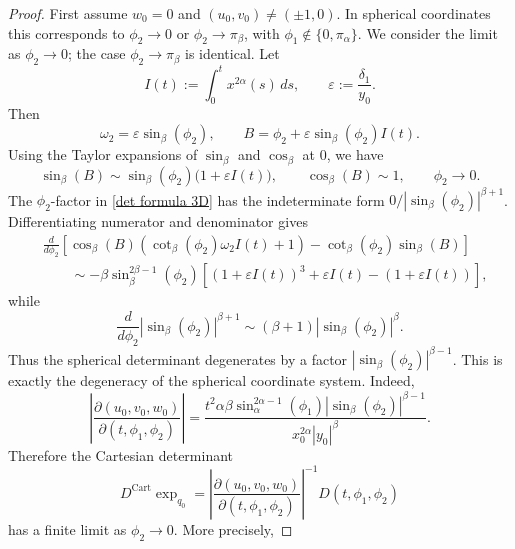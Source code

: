 \documentclass[12pt]{amsart}
\numberwithin{equation}{section}
\theoremstyle{plain}
\theoremstyle{definition}
\theoremstyle{remark}
\begin{document}
\begin{proof}
    First assume \(w_0=0\) and \((u_0,v_0)\neq(\pm1,0)\). In spherical coordinates this
    corresponds to \(\phi_2\to0\) or \(\phi_2\to\pi_\beta\), with
    \(\phi_1\notin\{0,\pi_\alpha\}\). We consider the limit as \(\phi_2\to0\); the case
    \(\phi_2\to\pi_\beta\) is identical. Let
    \[
        I(t):=\int_0^t x^{2\alpha}(s)\,ds,
        \qquad
        \varepsilon:=\frac{\delta_1}{y_0}.
    \]
    Then
    \[
        \omega_2=\varepsilon\sin_\beta(\phi_2),
        \qquad
        B=\phi_2+\varepsilon\sin_\beta(\phi_2)I(t).
    \]
    Using the Taylor expansions of \(\sin_\beta\) and \(\cos_\beta\) at \(0\), we have
    \[
        \sin_\beta(B)
        \sim
        \sin_\beta(\phi_2)\bigl(1+\varepsilon I(t)\bigr),
        \qquad
        \cos_\beta(B)\sim 1,
        \qquad
        \phi_2\to0.
    \]
    The \(\phi_2\)-factor in \eqref{det formula 3D} has the indeterminate form
    \(0/|\sin_\beta(\phi_2)|^{\beta+1}\). Differentiating numerator and denominator gives
    \[
        \begin{aligned}
             & \frac{d}{d\phi_2}
            \left[
                \cos_\beta(B)
                \left(\cot_\beta(\phi_2)\omega_2 I(t)+1\right)
                -
                \cot_\beta(\phi_2)\sin_\beta(B)
                \right]
            \\
             & \qquad\sim
            -\beta\sin_\beta^{2\beta-1}(\phi_2)
            \left[
                (1+\varepsilon I(t))^3
                +
                \varepsilon I(t)
                -
                (1+\varepsilon I(t))
                \right],
        \end{aligned}
    \]
    while
    \[
        \frac{d}{d\phi_2}
        |\sin_\beta(\phi_2)|^{\beta+1}
        \sim
        (\beta+1)|\sin_\beta(\phi_2)|^\beta .
    \]
    Thus the spherical determinant degenerates by a factor
    \(|\sin_\beta(\phi_2)|^{\beta-1}\). This is exactly the degeneracy of the spherical
    coordinate system. Indeed,
    \[
        \left|
        \frac{\partial(u_0,v_0,w_0)}
        {\partial(t,\phi_1,\phi_2)}
        \right|
        =
        \frac{
            t^2\alpha\beta
            \sin_\alpha^{2\alpha-1}(\phi_1)
            |\sin_\beta(\phi_2)|^{\beta-1}
        }{
            x_0^{2\alpha}|y_0|^\beta
        }.
    \]
    Therefore the Cartesian determinant
    \[
        D^{\operatorname{Cart}}\exp_{q_0}
        =
        \left|
        \frac{\partial(u_0,v_0,w_0)}
        {\partial(t,\phi_1,\phi_2)}
        \right|^{-1}
        D(t,\phi_1,\phi_2)
    \]
    has a finite limit as \(\phi_2\to0\). More precisely,

\end{proof}
\end{document}
